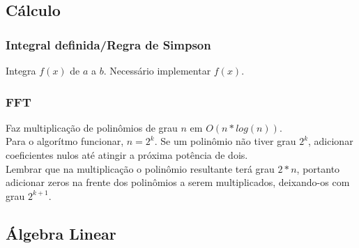 \subsection{Cálculo}

\subsubsection{Integral definida/Regra de Simpson}
Integra $f(x)$ de $a$ a $b$. Necessário implementar $f(x)$.

\divisor

\subsubsection{FFT}
Faz multiplica\c{c}\~{a}o de polin\^{o}mios de grau $n$ em $O(n*log(n))$.\\
Para o algor\'{i}tmo funcionar, $n=2^k$. Se um polin\^{o}mio n\~{a}o tiver grau $2^k$, adicionar coeficientes nulos at\'{e} atingir a pr\'{o}xima pot\^{e}ncia de dois.\\
Lembrar que na multiplica\c{c}\~{a}o o polin\^{o}mio resultante ter\'{a} grau $2*n$, portanto adicionar zeros na frente dos polin\^{o}mios a serem multiplicados, deixando-os com grau $2^{k+1}$.

\divisor


\subsection{Álgebra Linear}


